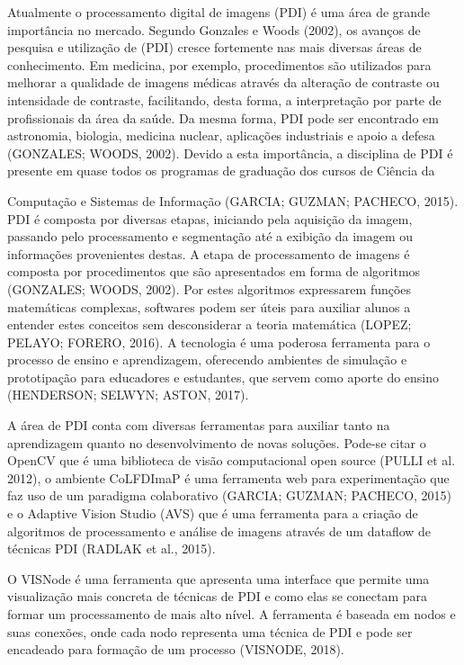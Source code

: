 \documentclass[
	12pt,				%
	oneside,			%
	a4paper,			%
	english,			%
	french,				%
	spanish,			%
	brazil,				%
	]{abntex2}
\begin{document}
Atualmente o processamento digital de imagens (PDI) é uma área de grande importância no mercado. Segundo Gonzales e Woods (2002), os avanços de pesquisa e utilização de  (PDI) cresce fortemente nas mais diversas áreas de conhecimento. Em medicina, por exemplo, procedimentos são utilizados para melhorar a qualidade de imagens médicas através da alteração de contraste ou intensidade de contraste, facilitando, desta forma, a interpretação por parte de profissionais da área da saúde. Da mesma forma, PDI pode ser encontrado em astronomia, biologia, medicina nuclear, aplicações industriais e apoio a defesa (GONZALES; WOODS, 2002). Devido a esta importância, a disciplina de PDI é presente em quase todos os programas de graduação dos cursos de Ciência da 

Computação e Sistemas de Informação (GARCIA; GUZMAN; PACHECO, 2015).
PDI é composta por diversas etapas, iniciando pela aquisição da imagem, passando pelo processamento e segmentação até a exibição da imagem ou informações provenientes destas. A etapa de processamento de imagens é composta por procedimentos que são apresentados em forma de algoritmos (GONZALES; WOODS, 2002). Por estes algoritmos expressarem funções matemáticas complexas, softwares podem ser úteis para auxiliar alunos a entender estes conceitos sem desconsiderar a teoria matemática (LOPEZ; PELAYO; FORERO, 2016). A tecnologia é uma poderosa ferramenta para o processo de ensino e aprendizagem, oferecendo ambientes de simulação e prototipação para educadores e estudantes, que servem como aporte do ensino (HENDERSON; SELWYN; ASTON, 2017).

A área de PDI conta com diversas ferramentas para auxiliar tanto na aprendizagem quanto no desenvolvimento de novas soluções. Pode-se citar o OpenCV que é uma biblioteca de visão computacional open source (PULLI et al. 2012), o ambiente CoLFDImaP é uma ferramenta web para experimentação que faz uso de um paradigma colaborativo (GARCIA; GUZMAN; PACHECO, 2015) e o Adaptive Vision Studio (AVS) que é uma ferramenta para a criação de algoritmos de processamento e análise de imagens através de um dataflow de técnicas PDI (RADLAK et al., 2015).

O VISNode é uma ferramenta que apresenta uma interface que permite uma visualização mais concreta de técnicas de PDI e como elas se conectam para formar um processamento de mais alto nível. A ferramenta é baseada em nodos e suas conexões, onde cada nodo representa uma técnica de PDI e pode ser encadeado para formação de um processo (VISNODE, 2018).
\end{document}
